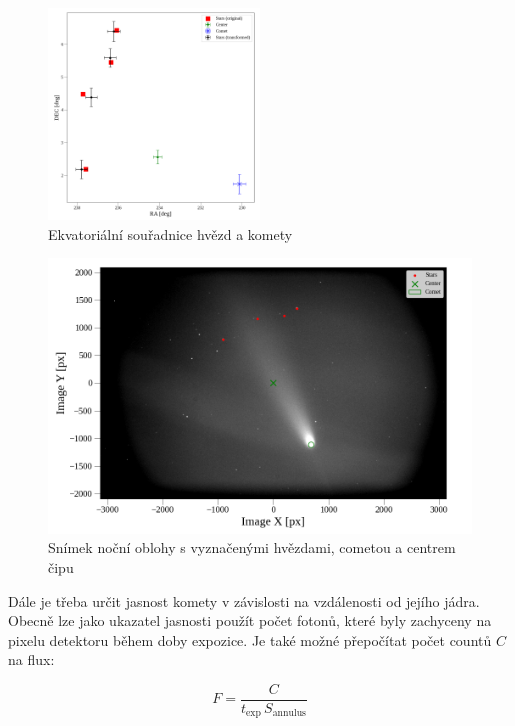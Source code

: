 \documentclass[a4paper,11pt,twocolumn]{article}
\begin{document}
        \begin{figure}
            \centering
            \includegraphics[width=0.5\textwidth]{barnard_radec}
            \caption{Ekvatoriální souřadnice hvězd a komety}
            \label{fig:barnard_radec}
        \end{figure}
        
        \begin{figure}
            \centering
            \includegraphics[width=1\textwidth]{barnard_sky}
            \caption{Snímek noční oblohy s vyznačenými hvězdami, cometou a centrem čipu}
            \label{fig:barnard_sky}
        \end{figure}

        Dále je třeba určit jasnost komety v závislosti na vzdálenosti od jejího jádra. Obecně lze jako ukazatel jasnosti použít počet fotonů, které byly zachyceny na pixelu detektoru během doby expozice. Je také možné přepočítat počet countů $C$ na flux:

        \begin{equation}
            F = \frac{C}{t_{\text{exp}} \, S_{\text{annulus}}}
        \end{equation}
        
\end{document}
